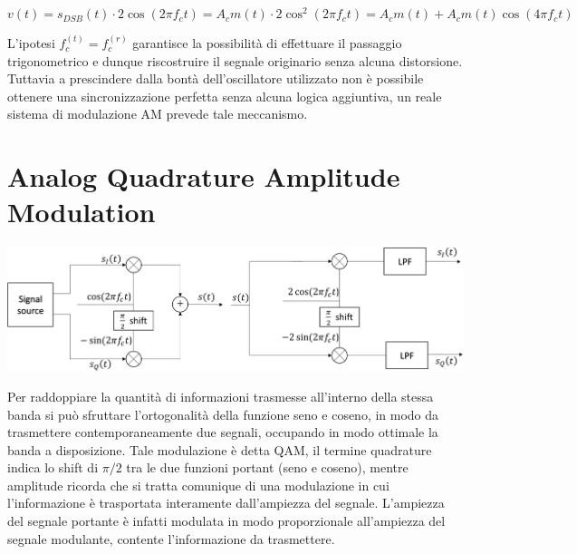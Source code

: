 \begin{equation*}
    v(t) = s_{DSB}(t) \cdot 2\cos(2\pi f_c t) = A_c m(t) \cdot 2\cos^2(2\pi f_c t) = A_c m(t) + A_c m(t) \cos(4\pi f_c t)
\end{equation*}

L'ipotesi $f_c^{(t)} = f_c^{(r)}$ garantisce la possibilità di effettuare il passaggio trigonometrico e dunque riscostruire il segnale originario senza alcuna distorsione. Tuttavia a prescindere dalla bontà dell'oscillatore utilizzato non è possibile ottenere una sincronizzazione perfetta senza alcuna logica aggiuntiva, un reale sistema di modulazione AM prevede tale meccanismo.

\section*{Analog Quadrature Amplitude Modulation}

\begin{center}
    \includegraphics[width=1\textwidth]{imgs/analog_qam.png}
\end{center}

















Per raddoppiare la quantità di informazioni trasmesse all'interno della stessa banda si può sfruttare l'ortogonalità della funzione seno e coseno, in modo da trasmettere contemporaneamente due segnali, occupando in modo ottimale la banda a disposizione. Tale modulazione è detta QAM, il termine quadrature indica lo shift di $\pi/2$ tra le due funzioni portant (seno e coseno), mentre amplitude ricorda che si tratta comunique di una modulazione in cui l'informazione è trasportata interamente dall'ampiezza del segnale. L'ampiezza del segnale portante è infatti modulata in modo proporzionale all'ampiezza del segnale modulante, contente l'informazione da trasmettere.





